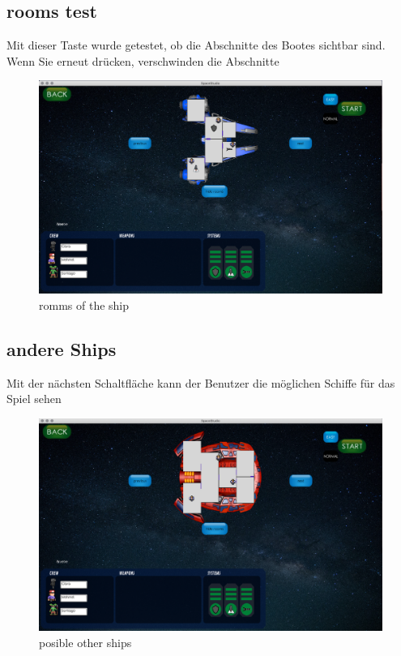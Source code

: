 \documentclass[11pt]{article}
\begin{document}
\subsection{rooms test}

Mit dieser Taste wurde getestet, ob die Abschnitte des Bootes sichtbar sind. Wenn Sie erneut drücken, verschwinden die Abschnitte\\
\begin{figure}
\centering
\includegraphics[scale=0.3]{TestProtocolBilder/shipRooms.png}
\caption{romms of the ship}
\end{figure}

\newpage
\subsection{andere Ships}
Mit der nächsten Schaltfläche kann der Benutzer die möglichen Schiffe für das Spiel sehen
\begin{figure}
\centering
\includegraphics[scale=0.3]{TestProtocolBilder/next.png}
\caption{posible other ships}
\end{figure}
\end{document}
